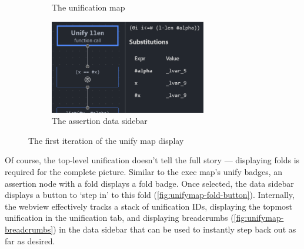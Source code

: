 \begin{figure}
\begin{subfigure}[b]{0.3\textwidth}
    \caption{The unification map}%
    \label{fig:unifymap-init}
  \end{subfigure}
  \qquad
  \begin{subfigure}[b]{0.5\textwidth}
    \centering
    \includegraphics[width=0.75\textwidth]{img/unifymap-sidebar.png}
    \caption{The assertion data sidebar}%
    \label{fig:unifymap-sidebar}
  \end{subfigure}
  \caption{The first iteration of the unify map display}
\end{figure}

Of course, the top-level unification doesn't tell the full story --- displaying
folds is required for the complete picture. Similar to the exec map's unify
badges, an assertion node with a fold displays a fold badge. Once selected,
the data sidebar displays a button to `step in' to this fold
(\autoref{fig:unifymap-fold-button}). Internally, the webview effectively tracks
a stack of unification IDs, displaying the topmost unification in the
unification tab, and displaying breadcrumbs (\autoref{fig:unifymap-breadcrumbs})
in the data sidebar that can be used to instantly step back out as far as
desired.

